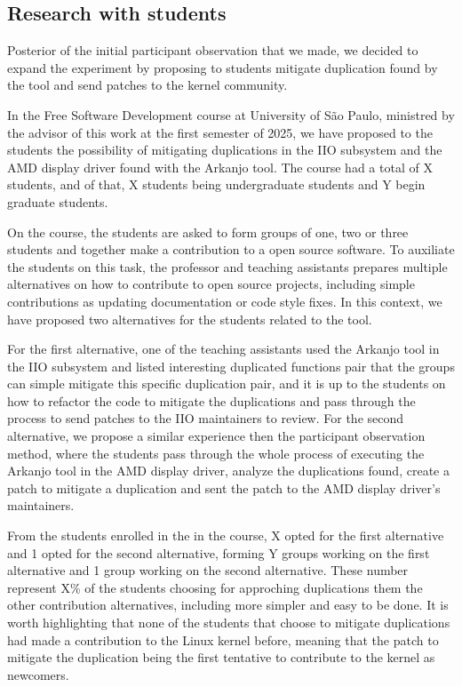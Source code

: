 \subsection{Research with students}


Posterior of the initial participant observation that we made, we decided to expand the experiment 
by proposing to students mitigate duplication found by the tool and send patches to the kernel community.

In the Free Software Development course at University of São Paulo, ministred by the advisor 
of this work at the first semester of 2025, we have proposed to the students the possibility
of mitigating duplications in the IIO subsystem and the AMD display driver found with the Arkanjo tool.
The course had a total of X students, and of that, X students being undergraduate students
and Y begin graduate students.

On the course, the students are asked to form groups of one, two or three students and together 
make a contribution to a open source software. To auxiliate the students on this task, the 
professor and teaching assistants prepares multiple alternatives on how to contribute to open source projects, 
including simple contributions as updating documentation or code style fixes. In this context, 
we have proposed two alternatives for the students related to the tool.

For the first alternative, one of the teaching assistants used the Arkanjo tool in the IIO subsystem and
listed interesting duplicated functions pair that the groups can simple mitigate this specific duplication pair, 
and it is up to the students on how
to refactor the code to mitigate the duplications and pass through the process to send patches to the IIO 
maintainers to review. For the second alternative, we propose a similar experience then the 
participant observation method, where the students pass through the whole process of executing the Arkanjo tool
in the AMD display driver, analyze the duplications found, create a patch to mitigate a duplication and sent
the patch to the AMD display driver's maintainers.

From the students enrolled in the in the course, X opted for the first alternative and 1 opted for the second
alternative, forming Y groups working on the first alternative and 1 group working on the second alternative. 
These number represent X\% of the students choosing for approching duplications them the other contribution 
alternatives, including more simpler and easy to be done.  It is worth highlighting that none of the students
that choose to mitigate duplications had made a contribution to the Linux kernel before,
meaning that the patch to mitigate the duplication being the first tentative to contribute to the kernel as
newcomers.

